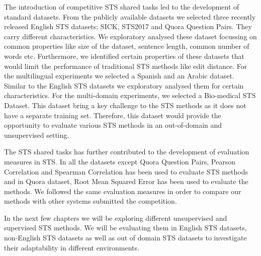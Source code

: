 The introduction of competitive STS shared tasks led to the development of standard datasets. From the publicly available datasets we selected three recently released English STS datasets; SICK, STS2017 and Quora Question Pairs. They carry different characteristics. We exploratory analysed these dataset focussing on common properties like size of the dataset, sentence length, common number of words etc. Furthermore, we identified certain properties of these datasets that would limit the performance of traditional STS methods like edit distance. For the multilingual experiments we selected a Spanish and an Arabic dataset. Similar to the English STS datasets we exploratory analysed them for certain characteristics. For the multi-domain experiments, we selected a Bio-medical STS Dataset. This dataset bring a key challenge to the STS methods as it does not have a separate training set. Therefore, this dataset would provide the opportunity to evaluate various STS methods in an out-of-domain and unsupervised setting.

The STS shared tasks has further contributed to the development of evaluation measures in STS. In all the datasets except Quora Question Pairs, Pearson Correlation and Spearman Correlation has been used to evaluate STS methods and in Quora dataset, Root Mean Squared Error has been used to evaluate the methods. We followed the same evaluation measures in order to compare our methods with other systems submitted the competition. 

In the next few chapters we will be exploring different unsupervised and supervised STS methods. We will be evaluating them in English STS datasets, non-English STS datasets as well as out of domain STS datasets to investigate their adaptability in different environments.

   


